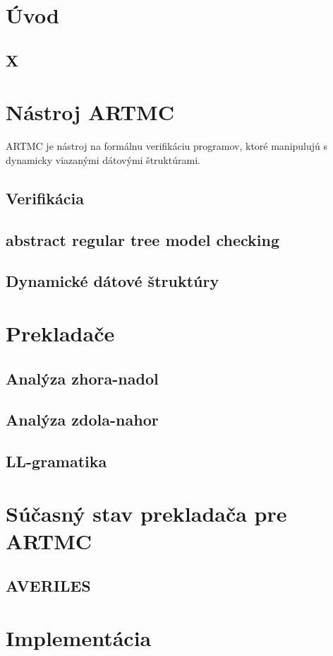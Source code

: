 
\chapter{Úvod}

\section{X}

\chapter{Nástroj ARTMC}
ARTMC je nástroj na formálnu verifikáciu programov, ktoré manipulujú s
dynamicky viazanými dátovými štruktúrami.
\section{Verifikácia}
\section{abstract regular tree model checking}
\section{Dynamické dátové štruktúry}
\chapter{Prekladače}
\section{Analýza zhora-nadol}
\section{Analýza zdola-nahor}
\section{LL-gramatika}
\chapter{Súčasný stav prekladača pre ARTMC}
\section{AVERILES}
\chapter{Implementácia}
